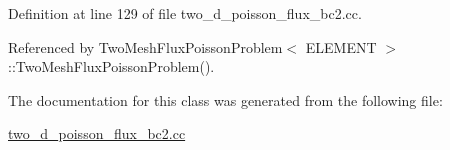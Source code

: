 Definition at line 129 of file two\+\_\+d\+\_\+poisson\+\_\+flux\+\_\+bc2.\+cc.



Referenced by Two\+Mesh\+Flux\+Poisson\+Problem$<$ E\+L\+E\+M\+E\+N\+T $>$\+::\+Two\+Mesh\+Flux\+Poisson\+Problem().



The documentation for this class was generated from the following file\+:\begin{DoxyCompactItemize}
\item 
\hyperlink{two__d__poisson__flux__bc2_8cc}{two\+\_\+d\+\_\+poisson\+\_\+flux\+\_\+bc2.\+cc}\end{DoxyCompactItemize}
